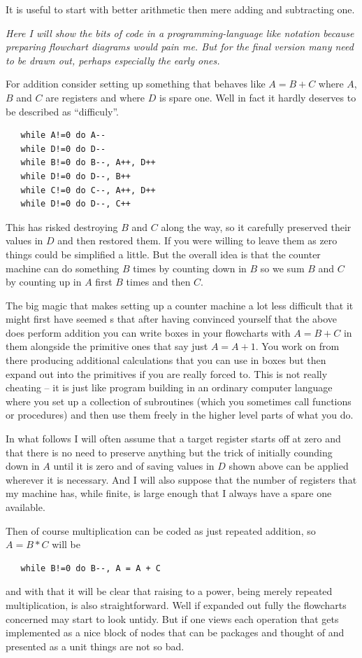 It is useful to start with better arithmetic then mere adding and subtracting
one.

{\it Here I will show the bits of code in a programming-language like notation
because preparing flowchart diagrams would pain me. But for the final
version many need to be drawn out, perhaps especially the early ones. }

For addition consider setting up something that behaves like $A = B+C$ where
$A$, $B$ and $C$ are registers and where $D$ is spare one.
Well in fact it hardly deserves to be described as ``difficuly''.
\begin{verbatim}
   while A!=0 do A--
   while D!=0 do D--
   while B!=0 do B--, A++, D++
   while D!=0 do D--, B++
   while C!=0 do C--, A++, D++
   while D!=0 do D--, C++
\end{verbatim}
This has risked destroying $B$ and $C$ along the way, so it carefully
preserved their values in $D$ and then restored them. If you were willing
to leave them as zero things could be simplified a little. But the overall
idea is that the counter machine can do something $B$ times by counting down
in $B$ so we sum $B$ and $C$ by counting up in $A$ first $B$ times and
then $C$.

The big magic that makes setting up a counter machine a lot less difficult
that it might first have seemed s that after having convinced yourself
that the above does perform addition you can write boxes in your flowcharts
with $A = B+C$ in them alongside the primitive ones that say just $A = A+1$.
You work on from there producing additional calculations that you can
use in boxes but then expand out into the primitives if you are really
forced to. This is not really cheating -- it is just like program
building in an ordinary computer language where you set up a collection
of subroutines (which you sometimes call functions or procedures) and then
use them freely in the higher level parts of what you do.

In what follows I will often assume that a target register starts off at zero
and that there is no need to preserve anything but the trick of initially
counding down in $A$ until it is zero and of saving values in $D$ shown above
can be applied wherever it is necessary. And I will also suppose that the
number of registers that my machine has, while finite, is large enough that
I always have a spare one available. 

Then of course multiplication can be coded as just repeated addition, so
$A = B*C$ will be
\begin{verbatim}
   while B!=0 do B--, A = A + C
\end{verbatim}
and with that it will be clear that raising to a power, being merely
repeated multiplication, is also straightforward. Well if expanded out
fully the flowcharts concerned may start to look untidy. But if one
views each operation that gets implemented as a nice block of nodes that
can be packages and thought of and presented as a unit things are not
so bad.

